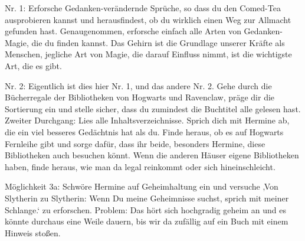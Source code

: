 \begin{em}
Nr. 1: Erforsche Gedanken-verändernde Sprüche, so dass du den Comed-Tea ausprobieren kannst und herausfindest, ob du wirklich einen Weg zur Allmacht gefunden hast. Genaugenommen, erforsche einfach alle Arten von Gedanken-Magie, die du finden kannst. Das Gehirn ist die Grundlage unserer Kräfte als Menschen, jegliche Art von Magie, die darauf Einfluss nimmt, ist die wichtigste Art, die es gibt.

Nr. 2: Eigentlich ist dies hier Nr. 1, und das andere Nr. 2. Gehe durch die Bücherregale der Bibliotheken von Hogwarts und Ravenclaw, präge dir die Sortierung ein und stelle sicher, dass du zumindest die Buchtitel alle gelesen hast. Zweiter Durchgang: Lies alle Inhaltsverzeichnisse. Sprich dich mit Hermine ab, die ein viel besseres Gedächtnis hat als du. Finde heraus, ob es auf Hogwarts Fernleihe gibt und sorge dafür, dass ihr beide, besonders Hermine, diese Bibliotheken auch besuchen könnt. Wenn die anderen Häuser eigene Bibliotheken haben, finde heraus, wie man da legal reinkommt oder sich hineinschleicht.

Möglichkeit 3a: Schwöre Hermine auf Geheimhaltung ein und versuche ‚Von Slytherin zu Slytherin: Wenn Du meine Geheimnisse suchst, sprich mit meiner Schlange.‘ zu erforschen. Problem: Das hört sich hochgradig geheim an und es könnte durchaus eine Weile dauern, bis wir da zufällig auf ein Buch mit einem Hinweis stoßen.


\end{em}
